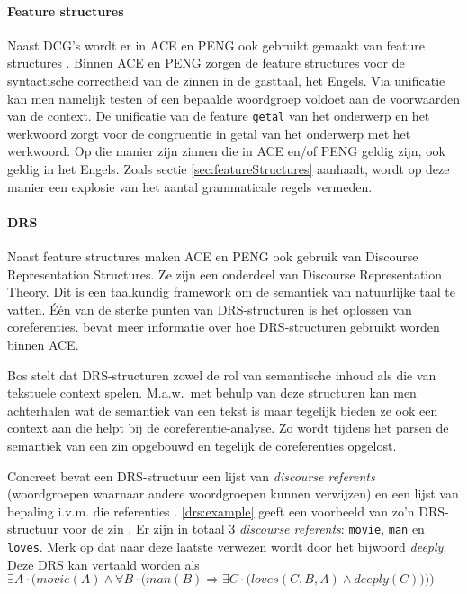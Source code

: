 \paragraph{Feature structures} Naast DCG's wordt er in ACE en PENG ook gebruikt gemaakt van feature structures \cite{Shieber2003, NLPCourse}. Binnen ACE en PENG zorgen de feature structures voor de syntactische correctheid van de zinnen in de gasttaal, het Engels. Via unificatie kan men namelijk testen of een bepaalde woordgroep voldoet aan de voorwaarden van de context. De unificatie van de feature \texttt{getal} van het onderwerp en het werkwoord zorgt voor de congruentie in getal van het onderwerp met het werkwoord. Op die manier zijn zinnen die in ACE en/of PENG geldig zijn, ook geldig in het Engels. Zoals sectie \ref{sec:featureStructures} aanhaalt, wordt op deze manier een explosie van het aantal grammaticale regels vermeden.

\paragraph{DRS} Naast feature structures maken ACE en PENG ook gebruik van Discourse Representation Structures. Ze zijn een onderdeel van Discourse Representation Theory. Dit is een taalkundig framework om de semantiek van natuurlijke taal te vatten. Één van de sterke punten van DRS-structuren is het oplossen van coreferenties. \cite{Fuchs2008drs} bevat meer informatie over hoe DRS-structuren gebruikt worden binnen ACE.

Bos \cite{Bos2011} stelt dat DRS-structuren zowel de rol van semantische inhoud als die van tekstuele context spelen. M.a.w.\ met behulp van deze structuren kan men achterhalen wat de semantiek van een tekst is maar tegelijk bieden ze ook een context aan die helpt bij de coreferentie-analyse. Zo wordt tijdens het parsen de semantiek van een zin opgebouwd en tegelijk de coreferenties opgelost.

Concreet bevat een DRS-structuur een lijst van \textit{discourse referents} (woordgroepen waarnaar andere woordgroepen kunnen verwijzen) en een lijst van bepaling i.v.m. die referenties \cite{Bos2011}. \autoref{drs:example} geeft een voorbeeld van zo'n DRS-structuur voor de zin . Er zijn in totaal 3 \textit{discourse referents}: \texttt{movie}, \texttt{man} en \texttt{loves}. Merk op dat naar deze laatste verwezen wordt door het bijwoord \textit{deeply}. Deze DRS kan vertaald worden als $\exists A \cdot \bigg(movie(A) \land \forall B \cdot \Big(man(B) \Rightarrow \exists C \cdot \big( loves(C, B, A) \land deeply(C) \big)\Big)\bigg)$

